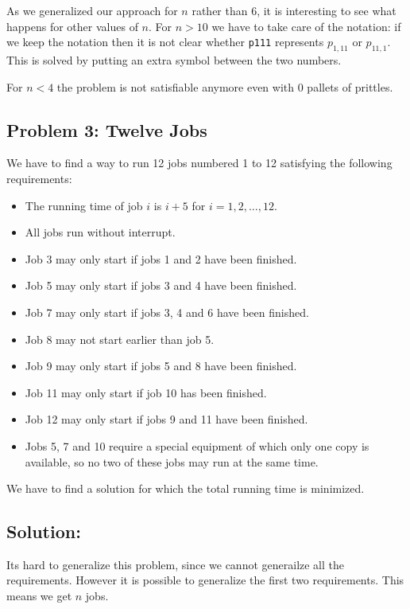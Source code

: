 \documentclass[12pt]{article}
\begin{document}
\noindent As we generalized our approach for $n$ rather than 6, it is
interesting to see what happens for other values of $n$. For $n
> 10$ we have to take care of the notation: if we keep the
notation then it is not clear whether {\tt p111} represents 
$p_{1,11}$ or $p_{11,1}$. This is solved by putting an extra 
symbol between the two numbers. 

For $n < 4$ the problem is not satisfiable anymore even with 0 pallets of prittles.

\subsection*{Problem 3: Twelve Jobs}

We have to find a way to run 12 jobs numbered 1 to 12 satisfying the following requirements:
\begin{itemize}
\item The running time of job $i$ is $i+5$ for $i = 1,2, \ldots ,12.$
\item All jobs run without interrupt.
\item Job 3 may only start if jobs 1 and 2 have been finished.
\item Job 5 may only start if jobs 3 and 4 have been finished.
\item Job 7 may only start if jobs 3, 4 and 6 have been finished.
\item Job 8 may not start earlier than job 5.
\item Job 9 may only start if jobs 5 and 8 have been finished.
\item Job 11 may only start if job 10 has been finished.
\item Job 12 may only start if jobs 9 and 11 have been finished.
\item Jobs 5, 7 and 10 require a special equipment of which only one copy is available, so no two of these jobs may run at the same time.
\end{itemize}
We have to find a solution for which the total running time is minimized. 

\vspace{8mm}

\subsection*{Solution:}
Its hard to generalize this problem, since we cannot generailze all the requirements. However it is possible to generalize the first two requirements. This means we get $n$ jobs.
\end{document}
